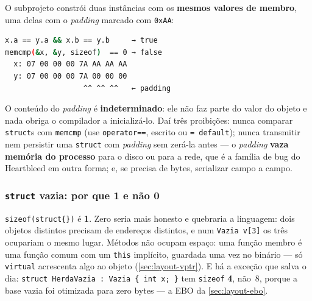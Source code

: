 O subprojeto constrói duas instâncias com os \textbf{mesmos valores de membro},
uma delas com o \emph{padding} marcado com \texttt{0xAA}:

\begin{lstlisting}[style=bt, language=bash,
    caption={Saída de \texttt{src/layout/}: membros iguais, bytes diferentes.}]
x.a == y.a && x.b == y.b     → true
memcmp(&x, &y, sizeof)  == 0 → false
  x: 07 00 00 00 7A AA AA AA
  y: 07 00 00 00 7A 00 00 00
                  ^^ ^^ ^^   ← padding
\end{lstlisting}

\begin{armadilha}[\texttt{memcmp} compara bytes; \texttt{==} compara valores]
O conteúdo do \emph{padding} é \textbf{indeterminado}: ele não faz parte do
valor do objeto e nada obriga o compilador a inicializá-lo. Daí três
proibições: nunca comparar \texttt{struct}s com \texttt{memcmp} (use
\texttt{operator==}, escrito ou \texttt{= default}); nunca transmitir nem
persistir uma \texttt{struct} com \emph{padding} sem zerá-la antes --- o
\emph{padding} \textbf{vaza memória do processo} para o disco ou para a rede,
que é a família de bug do Heartbleed em outra forma; e, se precisa de bytes,
serializar campo a campo.
\end{armadilha}

\subsubsection{\texttt{struct} vazia: por que 1 e não 0}

\texttt{sizeof(struct\{\})} é \textbf{1}. Zero seria mais honesto e quebraria a
linguagem: dois objetos distintos precisam de endereços distintos, e num
\texttt{Vazia v[3]} os três ocupariam o mesmo lugar. Métodos não ocupam espaço:
uma função membro é uma função comum com um \texttt{this} implícito, guardada
uma vez no binário --- só \texttt{virtual} acrescenta algo ao objeto
(\cref{sec:layout-vptr}). E há a exceção que salva o dia:
\texttt{struct HerdaVazia : Vazia \{ int x; \}} tem \texttt{sizeof}
\textbf{4}, não~8, porque a base vazia foi otimizada para zero bytes --- a EBO
da \cref{sec:layout-ebo}.

